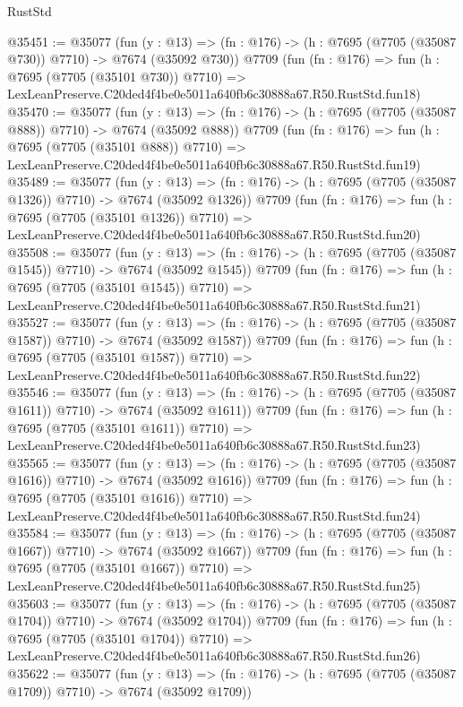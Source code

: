 \begin{lexlean}{RustStd}
\begin{coremodule}
@35451 := @35077
    (fun (y : @13) => (fn : @176) -> (h : @7695 (@7705 (@35087 @730)) @7710) -> @7674 (@35092 @730))
    @7709
    (fun (fn : @176) =>
    fun (h : @7695 (@7705 (@35101 @730)) @7710) =>
    LexLeanPreserve.C20ded4f4be0e5011a640fb6c30888a67.R50.RustStd.fun18)
@35470 := @35077
    (fun (y : @13) => (fn : @176) -> (h : @7695 (@7705 (@35087 @888)) @7710) -> @7674 (@35092 @888))
    @7709
    (fun (fn : @176) =>
    fun (h : @7695 (@7705 (@35101 @888)) @7710) =>
    LexLeanPreserve.C20ded4f4be0e5011a640fb6c30888a67.R50.RustStd.fun19)
@35489 := @35077
    (fun (y : @13) =>
    (fn : @176) -> (h : @7695 (@7705 (@35087 @1326)) @7710) -> @7674 (@35092 @1326))
    @7709
    (fun (fn : @176) =>
    fun (h : @7695 (@7705 (@35101 @1326)) @7710) =>
    LexLeanPreserve.C20ded4f4be0e5011a640fb6c30888a67.R50.RustStd.fun20)
@35508 := @35077
    (fun (y : @13) =>
    (fn : @176) -> (h : @7695 (@7705 (@35087 @1545)) @7710) -> @7674 (@35092 @1545))
    @7709
    (fun (fn : @176) =>
    fun (h : @7695 (@7705 (@35101 @1545)) @7710) =>
    LexLeanPreserve.C20ded4f4be0e5011a640fb6c30888a67.R50.RustStd.fun21)
@35527 := @35077
    (fun (y : @13) =>
    (fn : @176) -> (h : @7695 (@7705 (@35087 @1587)) @7710) -> @7674 (@35092 @1587))
    @7709
    (fun (fn : @176) =>
    fun (h : @7695 (@7705 (@35101 @1587)) @7710) =>
    LexLeanPreserve.C20ded4f4be0e5011a640fb6c30888a67.R50.RustStd.fun22)
@35546 := @35077
    (fun (y : @13) =>
    (fn : @176) -> (h : @7695 (@7705 (@35087 @1611)) @7710) -> @7674 (@35092 @1611))
    @7709
    (fun (fn : @176) =>
    fun (h : @7695 (@7705 (@35101 @1611)) @7710) =>
    LexLeanPreserve.C20ded4f4be0e5011a640fb6c30888a67.R50.RustStd.fun23)
@35565 := @35077
    (fun (y : @13) =>
    (fn : @176) -> (h : @7695 (@7705 (@35087 @1616)) @7710) -> @7674 (@35092 @1616))
    @7709
    (fun (fn : @176) =>
    fun (h : @7695 (@7705 (@35101 @1616)) @7710) =>
    LexLeanPreserve.C20ded4f4be0e5011a640fb6c30888a67.R50.RustStd.fun24)
@35584 := @35077
    (fun (y : @13) =>
    (fn : @176) -> (h : @7695 (@7705 (@35087 @1667)) @7710) -> @7674 (@35092 @1667))
    @7709
    (fun (fn : @176) =>
    fun (h : @7695 (@7705 (@35101 @1667)) @7710) =>
    LexLeanPreserve.C20ded4f4be0e5011a640fb6c30888a67.R50.RustStd.fun25)
@35603 := @35077
    (fun (y : @13) =>
    (fn : @176) -> (h : @7695 (@7705 (@35087 @1704)) @7710) -> @7674 (@35092 @1704))
    @7709
    (fun (fn : @176) =>
    fun (h : @7695 (@7705 (@35101 @1704)) @7710) =>
    LexLeanPreserve.C20ded4f4be0e5011a640fb6c30888a67.R50.RustStd.fun26)
@35622 := @35077
    (fun (y : @13) =>
    (fn : @176) -> (h : @7695 (@7705 (@35087 @1709)) @7710) -> @7674 (@35092 @1709))

\end{coremodule}
\end{lexlean}
